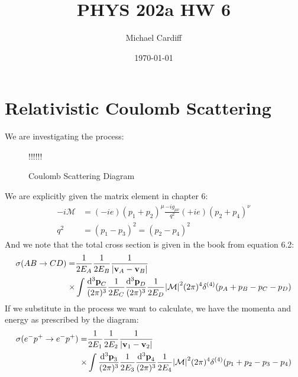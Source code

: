 \documentclass[12pt]{article}
\title{\vspace{-3em}PHYS 202a HW 6}
\author{Michael Cardiff}
\date{\today}
\def\a{!!!} \def\b{!!!}
\def\ifab{\ifx\a\b}
\begin{document}
\maketitle

\section{Relativistic Coulomb Scattering}
We are investigating the process:
\begin{figure}[H]
  \centering
  \ifab
  \fi
  \caption{Coulomb Scattering Diagram}
\end{figure}

We are explicitly given the matrix element in chapter 6:
\begin{align*}
  -i\mathcal{M}&=(-ie)(p_1+p_2)^\mu\frac{-ig_{\mu\nu}}{q^2}(+ie)(p_2+p_4)^\nu\\
  q^2&=(p_1-p_3)^2=(p_2-p_4)^2
\end{align*}
And we note that the total cross section is given in the book from equation 6.2:
\begin{align*}
  \sigma(AB\to CD)=&\frac{1}{2E_A}\frac1{2E_B}\frac1{\abs{\vb{v}_A-\vb{v}_B}}\\
  \times&\int\frac{\dd[3]{\vb{p}}_C}{(2\pi)^3}\frac1{2E_C}
  \frac{\dd[3]{\vb{p}}_D}{(2\pi)^3}\frac1{2E_D}\abs{\mathcal{M}}^2
  (2\pi)^4\delta^{(4)}(p_A+p_B-p_C-p_D)
\end{align*}
If we substitute in the process we want to calculate, we have the momenta and energy as prescribed by the diagram:
\begin{align*}
  \sigma({e^-}{p^+}\to {e^-}{p^+})
  =&\frac{1}{2E_1}\frac{1}{2E_2}
  \frac1{\abs{\vb{v}_1-\vb{v}_2}}\\
  \times&\int\frac{\dd[3]{\vb{p}}_{3}}{(2\pi)^3}\frac1{2E_{3}}
  \frac{\dd[3]{\vb{p}}_{4}}{(2\pi)^3}\frac1{2E_{4}}\abs{\mathcal{M}}^2
  (2\pi)^4\delta^{(4)}(p_1+p_2-p_3-p_4)
\end{align*}
\end{document}

